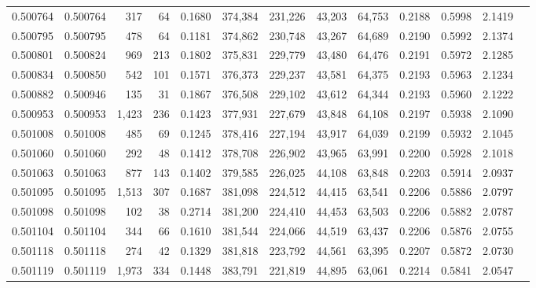 \begin{tabular}{rrrrrrrrrrrrr}
0.500764 & 0.500764 &   317 &    64 &                                     0.1680 & 374,384 & 231,226 &  43,203 &  64,753 & 0.2188 & 0.5998 & 2.1419 \\
0.500795 & 0.500795 &   478 &    64 &                                     0.1181 & 374,862 & 230,748 &  43,267 &  64,689 & 0.2190 & 0.5992 & 2.1374 \\
0.500801 & 0.500824 &   969 &   213 &                                     0.1802 & 375,831 & 229,779 &  43,480 &  64,476 & 0.2191 & 0.5972 & 2.1285 \\
0.500834 & 0.500850 &   542 &   101 &                                     0.1571 & 376,373 & 229,237 &  43,581 &  64,375 & 0.2193 & 0.5963 & 2.1234 \\
0.500882 & 0.500946 &   135 &    31 &                                     0.1867 & 376,508 & 229,102 &  43,612 &  64,344 & 0.2193 & 0.5960 & 2.1222 \\
0.500953 & 0.500953 & 1,423 &   236 &                                     0.1423 & 377,931 & 227,679 &  43,848 &  64,108 & 0.2197 & 0.5938 & 2.1090 \\
0.501008 & 0.501008 &   485 &    69 &                                     0.1245 & 378,416 & 227,194 &  43,917 &  64,039 & 0.2199 & 0.5932 & 2.1045 \\
0.501060 & 0.501060 &   292 &    48 &                                     0.1412 & 378,708 & 226,902 &  43,965 &  63,991 & 0.2200 & 0.5928 & 2.1018 \\
0.501063 & 0.501063 &   877 &   143 &                                     0.1402 & 379,585 & 226,025 &  44,108 &  63,848 & 0.2203 & 0.5914 & 2.0937 \\
0.501095 & 0.501095 & 1,513 &   307 &                                     0.1687 & 381,098 & 224,512 &  44,415 &  63,541 & 0.2206 & 0.5886 & 2.0797 \\
0.501098 & 0.501098 &   102 &    38 &                                     0.2714 & 381,200 & 224,410 &  44,453 &  63,503 & 0.2206 & 0.5882 & 2.0787 \\
0.501104 & 0.501104 &   344 &    66 &                                     0.1610 & 381,544 & 224,066 &  44,519 &  63,437 & 0.2206 & 0.5876 & 2.0755 \\
0.501118 & 0.501118 &   274 &    42 &                                     0.1329 & 381,818 & 223,792 &  44,561 &  63,395 & 0.2207 & 0.5872 & 2.0730 \\
0.501119 & 0.501119 & 1,973 &   334 &                                     0.1448 & 383,791 & 221,819 &  44,895 &  63,061 & 0.2214 & 0.5841 & 2.0547 \\

\end{tabular}

